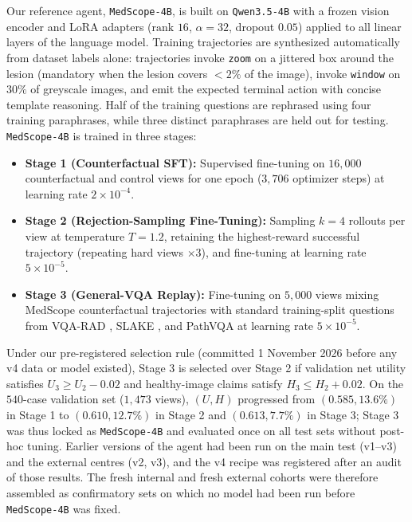 \documentclass[5p,times,twocolumn,authoryear]{elsarticle}
\begin{document}
Our reference agent, \texttt{MedScope-4B}, is built on \texttt{Qwen3.5-4B} with a frozen vision encoder and LoRA adapters ($\text{rank } 16$, $\alpha = 32$, dropout $0.05$) applied to all linear layers of the language model. Training trajectories are synthesized automatically from dataset labels alone: trajectories invoke \texttt{zoom} on a jittered box around the lesion (mandatory when the lesion covers $<2\%$ of the image), invoke \texttt{window} on $30\%$ of greyscale images, and emit the expected terminal action with concise template reasoning. Half of the training questions are rephrased using four training paraphrases, while three distinct paraphrases are held out for testing. \texttt{MedScope-4B} is trained in three stages:
\begin{itemize}[leftmargin=*,nosep]
    \item \textbf{Stage 1 (Counterfactual SFT):} Supervised fine-tuning on $16,000$ counterfactual and control views for one epoch ($3,706$ optimizer steps) at learning rate $2\times 10^{-4}$.
    \item \textbf{Stage 2 (Rejection-Sampling Fine-Tuning):} Sampling $k=4$ rollouts per view at temperature $T=1.2$, retaining the highest-reward successful trajectory (repeating hard views $\times 3$), and fine-tuning at learning rate $5\times 10^{-5}$.
    \item \textbf{Stage 3 (General-VQA Replay):} Fine-tuning on $5,000$ views mixing MedScope counterfactual trajectories with standard training-split questions from VQA-RAD \citep{lau2018vqarad}, SLAKE \citep{liu2021slake}, and PathVQA \citep{he2020pathvqa} at learning rate $5\times 10^{-5}$.
\end{itemize}
Under our pre-registered selection rule (committed 1 November 2026 before any v4 data or model existed), Stage 3 is selected over Stage 2 if validation net utility satisfies $U_3 \ge U_2 - 0.02$ and healthy-image claims satisfy $H_3 \le H_2 + 0.02$. On the $540$-case validation set ($1,473$ views), $(U, H)$ progressed from $(0.585, 13.6\%)$ in Stage 1 to $(0.610, 12.7\%)$ in Stage 2 and $(0.613, 7.7\%)$ in Stage 3; Stage 3 was thus locked as \texttt{MedScope-4B} and evaluated once on all test sets without post-hoc tuning. Earlier versions of the agent had been run on the main test (v1--v3) and the external centres (v2, v3), and the v4 recipe was registered after an audit of those results. The fresh internal and fresh external cohorts were therefore assembled as confirmatory sets on which no model had been run before \texttt{MedScope-4B} was fixed.
\end{document}
